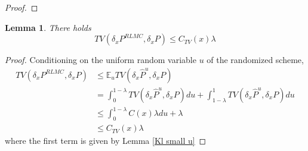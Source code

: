 \documentclass[11pt,a4paper,reqno]{amsart}
\theoremstyle{plain}
\newtheorem{lemma}{Lemma}
\theoremstyle{definition}
\theoremstyle{remark}
\newcommand{\E}{\mathbb{E}}
\begin{document}
\begin{proof}
 \end{proof}

\begin{lemma}
    There holds \[TV(\delta_x P^{RLMC}, \delta_x P)\leq C_{TV}(x) \lambda\]  
\end{lemma}
\begin{proof}
    Conditioning on the uniform random variable $u$ of the randomized scheme,
    \[\begin{aligned}TV(\delta_x P^{RLMC}, \delta_x P)&\leq \E_uTV(\delta_x \hat{P}^u,\delta_x P)\\&=\int_0^{1-\lambda} TV(\delta_x \hat{P}^u,\delta_x P)du + \int_{1-\lambda}^1  TV(\delta_x \hat{P}^u,\delta_x P)du \\&\leq \int_0^{1-\lambda} C(x)\lambda du + \lambda\\& \leq C_{TV}(x)\lambda \end{aligned}\]
    where the first term is given by Lemma \ref{Kl small u}
\end{proof}

     
\end{document}
